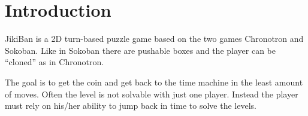 \section{Introduction}
JikiBan is a 2D turn-based puzzle game based on the two games
Chronotron and Sokoban. Like in Sokoban there are pushable boxes and
the player can be ``cloned'' as in Chronotron.

The goal is to get the coin and get back to the time machine in the
least amount of moves.  Often the level is not solvable with just one
player.  Instead the player must rely on his/her ability to jump back
in time to solve the levels.
